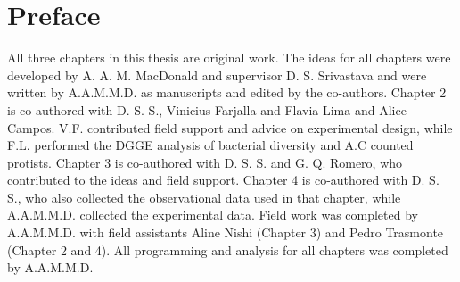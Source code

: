 \chapter*{Preface}

All three chapters in this thesis are original work. The ideas for all chapters were developed by A. A. M. MacDonald and supervisor D. S. Srivastava and were written by A.A.M.M.D. as manuscripts and edited by the co-authors.  Chapter 2 is co-authored with D. S. S., Vinicius Farjalla and Flavia Lima and Alice Campos. V.F. contributed field support and advice on experimental design, while F.L. performed the DGGE analysis of bacterial diversity and A.C counted protists. Chapter 3 is co-authored with D. S. S. and G. Q. Romero, who contributed to the ideas and field support. Chapter 4 is co-authored with D. S. S., who also collected the observational data used in that chapter, while A.A.M.M.D. collected the experimental data.  Field work was completed by A.A.M.M.D. with field assistants Aline Nishi (Chapter 3) and Pedro Trasmonte (Chapter 2 and 4).  All programming and analysis for all chapters was completed by A.A.M.M.D.

